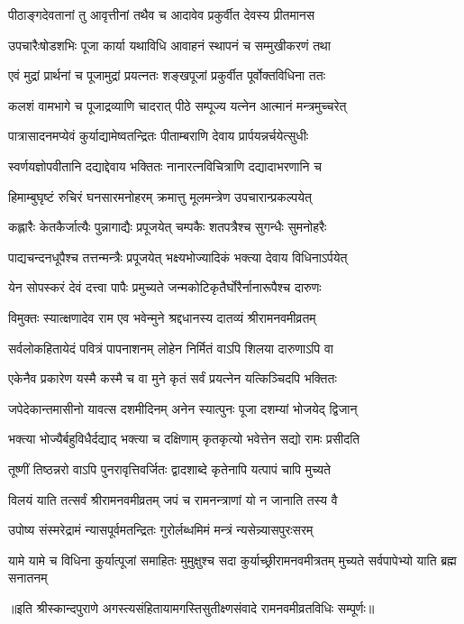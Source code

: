 \twolineshloka
{पीठाङ्गदेवतानां तु आवृत्तीनां तथैव च}
{आदावेव प्रकुर्वीत देवस्य प्रीतमानस}%

\twolineshloka
{उपचारैःषोडशभिः पूजा कार्या यथाविधि}
{आवाहनं स्थापनं च सम्मुखीकरणं तथा}%

\twolineshloka
{एवं मुद्रां प्रार्थनां च पूजामुद्रां प्रयत्नतः}
{शङ्खपूजां प्रकुर्वीत पूर्वोक्तविधिना ततः}%

\twolineshloka
{कलशं वामभागे च पूजाद्रव्याणि चादरात्}
{पीठे सम्पूज्य यत्नेन आत्मानं मन्त्रमुच्चरेत्}%

\twolineshloka
{पात्रासादनमप्येवं कुर्याद्यामेष्वतन्द्रितः}
{पीताम्बराणि देवाय प्रार्पयन्नर्चयेत्सुधीः}%

\twolineshloka
{स्वर्णयज्ञोपवीतानि दद्याद्देवाय भक्तितः}
{नानारत्नविचित्राणि दद्यादाभरणानि च}%

\twolineshloka
{हिमाम्बुघृष्टं रुचिरं घनसारमनोहरम्}
{क्रमात्तु मूलमन्त्रेण उपचारान्प्रकल्पयेत्}%

\twolineshloka
{कह्लारैः केतकैर्जात्यैः पुन्नागाद्यैः प्रपूजयेत्}
{चम्पकैः शतपत्रैश्च सुगन्धैः सुमनोहरैः}%

\twolineshloka
{पाद्यचन्दनधूपैश्च तत्तन्मन्त्रैः प्रपूजयेत्}
{भक्ष्यभोज्यादिकं भक्त्या देवाय विधिनाऽर्पयेत्}%

\twolineshloka
{येन सोपस्करं देवं दत्त्वा पापैः प्रमुच्यते}
{जन्मकोटिकृतैर्घोरैर्नानारूपैश्च दारुणः}%

\twolineshloka
{विमुक्तः स्यात्क्षणादेव राम एव भवेन्मुने}
{श्रद्दधानस्य दातव्यं श्रीरामनवमीव्रतम्}%

\twolineshloka
{सर्वलोकहितायेदं पवित्रं पापनाशनम्}
{लोहेन निर्मितं वाऽपि शिलया दारुणाऽपि वा}%

\twolineshloka
{एकेनैव प्रकारेण यस्मै कस्मै च वा मुने}
{कृतं सर्वं प्रयत्नेन यत्किञ्चिदपि भक्तितः}%

\twolineshloka
{जपेदेकान्तमासीनो यावत्स दशमीदिनम्}
{अनेन स्यात्पुनः पूजा दशम्यां भोजयेद् द्विजान्}%

\twolineshloka
{भक्त्या भोज्यैर्बहुविधैर्दद्याद् भक्त्या च दक्षिणाम्}
{कृतकृत्यो भवेत्तेन सद्यो रामः प्रसीदति}%

\twolineshloka
{तूष्णीं तिष्ठन्नरो वाऽपि पुनरावृत्तिवर्जितः}
{द्वादशाब्दे कृतेनापि यत्पापं चापि मुच्यते}%
 
\twolineshloka
{विलयं याति तत्सर्वं श्रीरामनवमीव्रतम्}
{जपं च रामनन्त्राणां यो न जानाति तस्य वै}%

\twolineshloka
{उपोष्य संस्मरेद्रामं न्यासपूर्वमतन्द्रितः}
{गुरोर्लब्धमिमं मन्त्रं न्यसेन्न्यासपुरःसरम्}%

\threelineshloka
{यामे यामे च विधिना कुर्यात्पूजां समाहितः}
{मुमुक्षुश्च सदा कुर्याच्छ्रीरामनवमीत्रतम्}
{मुच्यते सर्वपापेभ्यो याति ब्रह्म सनातनम्}%

॥इति श्रीस्कान्दपुराणे अगस्त्यसंहितायामगस्तिसुतीक्ष्णसंवादे रामनवमी\-व्रत\-विधिः सम्पूर्णः॥
